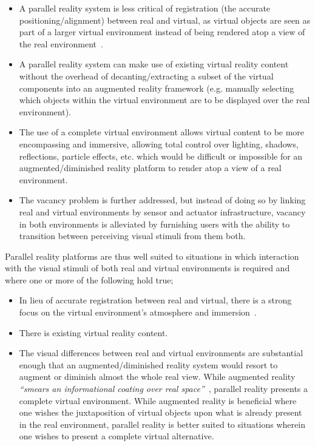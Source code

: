 \begin{itemize}
	\item A parallel reality system is less critical of registration (the accurate positioning/alignment) between real and virtual, as virtual objects are seen as part of a larger virtual environment instead of being rendered atop a view of the real environment~\cite{Azuma1997}.
	\item A parallel reality system can make use of existing virtual reality content without the overhead of decanting/extracting a subset of the virtual components into an augmented reality framework (e.g. manually selecting which objects within the virtual environment are to be displayed over the real environment).
	\item The use of a complete virtual environment allows virtual content to be more encompassing and immersive, allowing total control over lighting, shadows, reflections, particle effects, etc. which would be difficult or impossible for an augmented/diminished reality platform to render atop a view of a real environment.
	\item The vacancy problem is further addressed, but instead of doing so by linking real and virtual environments by sensor and actuator infrastructure, vacancy in both environments is alleviated by furnishing users with the ability to transition between perceiving visual stimuli from them both.
\end{itemize}

Parallel reality platforms are thus well suited to situations in which interaction with the visual stimuli of both real and virtual environments is required and where one or more of the following hold true;

\begin{itemize}
	\item In lieu of accurate registration between real and virtual, there is a strong focus on the virtual environment's atmosphere and immersion~\cite{deamicis:gamebased}.
	\item There is existing virtual reality content.
	\item The visual differences between real and virtual environments are substantial enough that an augmented/diminished reality system would resort to augment or diminish almost the whole real view. While augmented reality \textit{``smears an informational coating over real space''}~\cite{Andersen}, parallel reality presents a complete virtual environment. While augmented reality is beneficial where one wishes the juxtaposition of virtual objects upon what is already present in the real environment, parallel reality is better suited to situations wherein one wishes to present a complete virtual alternative.
\end{itemize}

